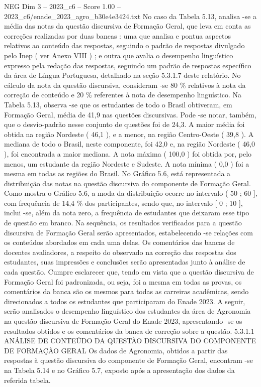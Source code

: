 \begin{textsample}{NEG Dim 3 – 2023\_c6 – Score 1.00 – 2023\_c6/enade\_2023\_agro\_b30e4e3424.txt}
No caso da Tabela 5.13, analisa -se a média das notas da questão discursiva de Formação Geral, que leva em conta as correções realizadas por duas bancas : uma que analisa e pontua aspectos relativos ao conteúdo das respostas, seguindo o padrão de respostas divulgado pelo Inep ( ver Anexo VIII ) ; e outra que avalia o desempenho linguístico expresso pela redação das respostas, seguindo um padrão de respostas específico da área de Língua Portuguesa, detalhado na seção 5.3.1.7 deste relatório.
No cálculo da nota da questão discursiva, consideram -se 80 \% relativos à nota da correção de conteúdo e 20 \% referentes à nota de desempenho linguístico.
Na Tabela 5.13, observa -se que os estudantes de todo o Brasil obtiveram, em Formação Geral, média de 41,9 nas questões discursivas.
Pode -se notar, também, que o desvio-padrão nesse conjunto de questões foi de 24,3.
A maior média foi obtida na região Nordeste ( 46,1 ), e a menor, na região Centro-Oeste ( 39,8 ).
A mediana de todo o Brasil, neste componente, foi 42,0 e, na região Nordeste ( 46,0 ), foi encontrada a maior mediana.
A nota máxima ( 100,0 ) foi obtida por, pelo menos, um estudante da região Nordeste e Sudeste.
A nota mínima ( 0,0 ) foi a mesma em todas as regiões do Brasil.
No Gráfico 5.6, está representada a distribuição das notas na questão discursiva do componente de Formação Geral.
Como mostra o Gráfico 5.6, a moda da distribuição ocorre no intervalo ( 50 ; 60 ], com frequência de 14,4 \% dos participantes, sendo que, no intervalo [ 0 ; 10 ], inclui -se, além da nota zero, a frequência de estudantes que deixaram esse tipo de questão em branco.
Na sequência, os resultados verificados para a questão discursiva de Formação Geral serão apresentados, estabelecendo -se relações com os conteúdos abordados em cada uma delas.
Os comentários das bancas de docentes avaliadores, a respeito do observado na correção das respostas dos estudantes, suas impressões e conclusões serão apresentadas junto à análise de cada questão.
Cumpre esclarecer que, tendo em vista que a questão discursiva de Formação Geral foi padronizada, ou seja, foi a mesma em todas as provas, os comentários da banca são os mesmos para todas as carreiras acadêmicas, sendo direcionados a todos os estudantes que participaram do Enade 2023.
A seguir, serão analisados o desempenho linguístico dos estudantes da área de Agronomia na questão discursiva de Formação Geral do Enade 2023, apresentando -se os resultados obtidos e os comentários da banca de correção sobre a questão. 5.3.1.1 ANÁLISE DE CONTEÚDO DA QUESTÃO DISCURSIVA DO COMPONENTE DE FORMAÇÃO GERAL Os dados de Agronomia, obtidos a partir das respostas à questão discursiva do componente de Formação Geral, encontram -se na Tabela 5.14 e no Gráfico 5.7, exposto após a apresentação dos dados da referida tabela.

\end{textsample}
